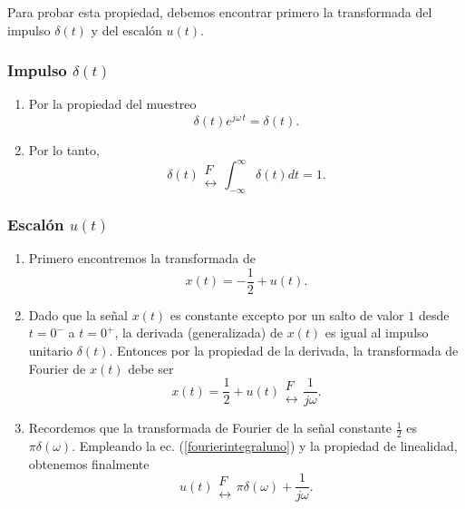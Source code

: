 Para probar esta propiedad, debemos encontrar primero la transformada del impulso $\delta(t)$
y del escal\'{o}n $u(t)$.

\subsubsection{Impulso $\delta(t)$}

\begin{enumerate}

\item Por la propiedad del muestreo
\begin{equation}
  \delta(t) e^{j \omega \, t} = \delta(t).
\end{equation}

\item Por lo tanto, 
\begin{equation}
  \delta(t) 
  \begin{array}{l}
    F \\ 
  \leftrightarrow
  \end{array}
  \int_{-\infty}^{\infty} \delta(t) dt = 1.
\end{equation}

\end{enumerate}

\subsubsection{Escal\'{o}n $u(t)$}

\begin{enumerate}

\item Primero encontremos la transformada de 
\begin{equation}
x(t) = -\frac{1}{2} + u(t).
\end{equation}

\item Dado que la se\~{n}al $x(t)$ es constante excepto por un salto de valor $1$ 
desde $t=0^{-}$ a $t=0^{+}$, la derivada (generalizada) de $x(t)$ es igual al 
impulso unitario $\delta(t)$. Entonces por la propiedad de la derivada, la transformada
de Fourier de $x(t)$ debe ser
\begin{equation}
  x(t) = \frac{1}{2} + u(t)
  \begin{array}{l}
    F \\ 
  \leftrightarrow
  \end{array}
  \frac{1}{j \omega}. \label{fourierintegraluno}
\end{equation}

\item Recordemos que la transformada de Fourier de la se\~{n}al constante $\frac{1}{2}$ es
$\pi \delta(\omega)$. Empleando la ec. (\ref{fourierintegraluno}) y la propiedad de linealidad,
obtenemos finalmente
\begin{equation}
  u(t) 
  \begin{array}{l}
    F \\ 
  \leftrightarrow
  \end{array}
  \pi \delta(\omega) + \frac{1}{j \omega}.
\end{equation}

\end{enumerate}

